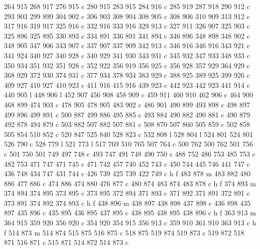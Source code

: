 {{        264 915 268 917 276 915 c
        280 915 283 915 284 916 c
        285 919 287 918 290 912 c
        293 903 299 899 304 902 c
        306 903 308 904 308 905 c
        308 906 310 909 313 912 c
        317 916 319 917 325 916 c
        332 916 333 916 329 913 c
        327 911 326 907 325 903 c
        325 896 325 895 330 893 c
        334 891 336 891 341 894 c
        346 896 348 898 348 902 c
        348 905 347 906 343 907 c
        337 907 337 909 342 913 c
        346 916 346 916 343 921 c
        341 924 340 927 340 928 c
        340 929 341 930 343 931 c
        345 932 347 933 348 933 c
        350 934 351 932 351 928 c
        352 922 356 919 356 925 c
        356 928 357 929 364 929 c
        368 929 372 930 374 931 c
        377 934 378 934 383 929 c
        388 925 389 925 399 926 c
        409 927 410 927 410 923 c
        411 916 415 916 439 923 c
        442 923 442 923 441 914 c
        440 905 l
        448 906 l
        452 907 456 908 458 909 c
        459 911 460 910 462 906 c
        464 900 468 899 474 903 c
        478 905 478 905 483 902 c
        486 901 490 899 493 898 c
        498 897 499 896 499 891 c
        500 887 499 886 495 885 c
        493 884 490 882 490 881 c
        490 879 492 878 494 879 c
        503 882 507 882 507 881 c
        508 870 507 860 505 859 c
        502 858 505 854 510 852 c
        520 847 525 840 528 823 c
        532 808 l
        528 804 l
        524 801 524 801 526 790 c
        528 779 l
        521 773 l
        517 769 510 765 507 764 c
        500 762 500 762 501 756 c
        501 750 501 749 497 748 c
        493 747 491 748 490 750 c
        488 752 486 753 485 753 c
        482 753 471 747 471 745 c
        471 742 457 740 452 743 c
        450 744 445 746 441 747 c
        436 748 434 747 431 744 c
        426 739 425 739 422 749 c
        h f
        483 878 m
        483 882 480 886 477 886 c
        474 886 474 880 476 877 c
        480 874 483 874 483 878 c
        h f
        374 893 m
        374 894 374 895 373 895 c
        373 895 372 894 371 893 c
        371 892 371 891 372 891 c
        373 891 374 892 374 893 c
        h f
        438 896 m
        438 897 438 898 437 898 c
        436 898 435 897 435 896 c
        435 895 436 895 437 895 c
        438 895 438 895 438 896 c
        h f
        363 913 m
        364 915 359 920 356 920 c
        354 920 354 915 356 913 c
        359 910 361 910 363 913 c
        h f
        514 873 m
        514 874 515 875 516 875 c
        518 875 519 874 519 873 c
        519 872 518 871 516 871 c
        515 871 514 872 514 873 c
}}
